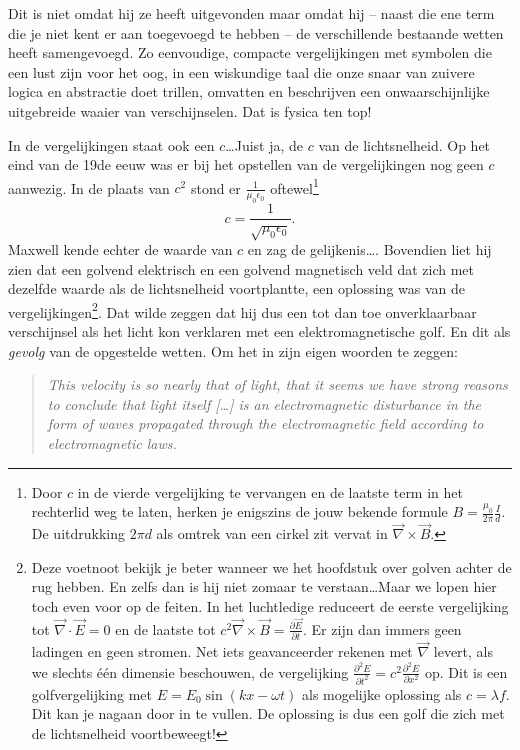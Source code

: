 Dit is niet omdat hij ze heeft uitgevonden maar omdat hij -- naast die ene term die je niet kent er aan toegevoegd te hebben -- de verschillende bestaande wetten heeft samengevoegd. Zo eenvoudige, compacte vergelijkingen met symbolen die een lust zijn voor het oog, in een wiskundige taal die onze snaar van zuivere logica en abstractie doet trillen, omvatten en beschrijven een onwaarschijnlijke uitgebreide waaier van verschijnselen. Dat is fysica ten top!

In de vergelijkingen staat ook een $c$\ldots Juist ja, de $c$ van de lichtsnelheid. Op het eind van de 19de eeuw was er bij het opstellen van de vergelijkingen nog geen $c$ aanwezig. In de plaats van $c^2$ stond er $\frac{1}{\mu_0\epsilon_0}$ oftewel\footnote{Door $c$ in de vierde vergelijking te vervangen en de laatste term in het rechterlid weg te laten, herken je enigszins de jouw bekende formule $B=\frac{\mu_0}{2\pi}\frac{I}{d}$. De uitdrukking $2\pi d$ als omtrek van een cirkel zit vervat in $\vec{\nabla}\times\vec{B}$.}
\begin{equation}
	c=\frac{1}{\sqrt{\mu_0\epsilon_0}}.
\end{equation}
Maxwell kende echter de waarde van $c$ en zag de gelijkenis\ldots. Bovendien liet hij zien dat een golvend elektrisch en een golvend magnetisch veld dat zich met dezelfde waarde als de lichtsnelheid voortplantte, een oplossing was van de vergelijkingen\footnote{Deze voetnoot bekijk je beter wanneer we het hoofdstuk over golven achter de rug hebben. En zelfs dan is hij niet zomaar te verstaan\ldots Maar we lopen hier toch even voor op de feiten. In het luchtledige reduceert de eerste vergelijking tot $\vec{\nabla}\cdot\vec{E}=0$ en de laatste tot $c^2\vec{\nabla}\times\vec{B}=\frac{\partial\vec{E}}{\partial t}$. Er zijn dan immers geen ladingen en geen stromen. Net iets geavanceerder rekenen met $\vec{\nabla}$ levert, als we slechts \'e\'en dimensie beschouwen, de vergelijking $\frac{\partial^2E}{\partial t^2}=c^2\frac{\partial^2E}{\partial x^2}$ op. Dit is een golfvergelijking met $E=E_0\sin(kx -\omega t)$ als mogelijke oplossing als $c=\lambda f$. Dit kan je nagaan door in te vullen. De oplossing is dus een golf die zich met de lichtsnelheid voortbeweegt!}. Dat wilde zeggen dat hij dus een tot dan toe onverklaarbaar verschijnsel als het licht kon verklaren met een elektromagnetische golf. En dit als \emph{gevolg} van de opgestelde wetten. Om het in zijn eigen woorden te zeggen:
\begin{quotation}
\emph{This velocity is so nearly that of light, that it seems we have strong reasons to conclude that light itself [\ldots] is an electromagnetic disturbance in the form of waves propagated through the electromagnetic field according to electromagnetic laws.}
\end{quotation}
